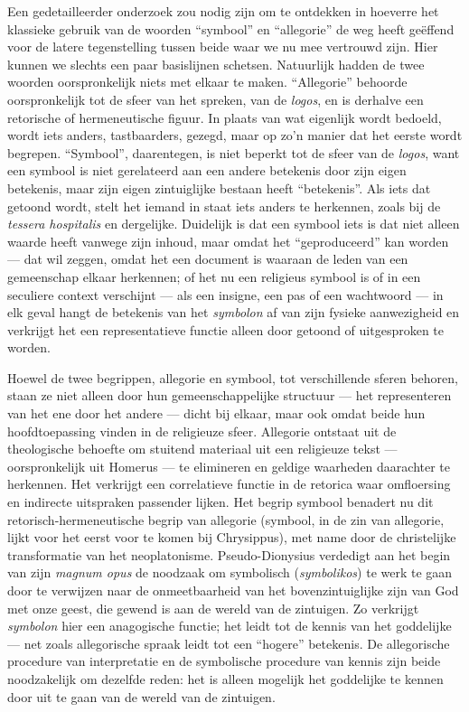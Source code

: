 Een gedetailleerder onderzoek zou nodig zijn om te ontdekken in hoeverre het klassieke gebruik van de woorden ``symbool'' en ``allegorie'' de weg heeft geëffend voor de latere tegenstelling tussen beide waar we nu mee vertrouwd zijn. Hier kunnen we slechts een paar basislijnen schetsen. Natuurlijk hadden de twee woorden oorspronkelijk niets met elkaar te maken. ``Allegorie'' behoorde oorspronkelijk tot de sfeer van het spreken, van de \textit{logos}, en is derhalve een retorische of hermeneutische figuur. In plaats van wat eigenlijk wordt bedoeld, wordt iets anders, tastbaarders, gezegd, maar op zo’n manier dat het eerste wordt begrepen. ``Symbool'', daarentegen, is niet beperkt tot de sfeer van de \textit{logos}, want een symbool is niet gerelateerd aan een andere betekenis door zijn eigen betekenis, maar zijn eigen zintuiglijke bestaan heeft ``betekenis''. Als iets dat getoond wordt, stelt het iemand in staat iets anders te herkennen, zoals bij de \textit{tessera hospitalis} en dergelijke. Duidelijk is dat een symbool iets is dat niet alleen waarde heeft vanwege zijn inhoud, maar omdat het ``geproduceerd'' kan worden — dat wil zeggen, omdat het een document is waaraan de leden van een gemeenschap elkaar herkennen; of het nu een religieus symbool is of in een seculiere context verschijnt — als een insigne, een pas of een wachtwoord — in elk geval hangt de betekenis van het \textit{symbolon} af van zijn fysieke aanwezigheid en verkrijgt het een representatieve functie alleen door getoond of uitgesproken te worden.

Hoewel de twee begrippen, allegorie en symbool, tot verschillende sferen behoren, staan ze niet alleen door hun gemeenschappelijke structuur — het representeren van het ene door het andere — dicht bij elkaar, maar ook omdat beide hun hoofdtoepassing vinden in de religieuze sfeer. Allegorie ontstaat uit de theologische behoefte om stuitend materiaal uit een religieuze tekst — oorspronkelijk uit Homerus — te elimineren en geldige waarheden daarachter te herkennen. Het verkrijgt een correlatieve functie in de retorica waar omfloersing en indirecte uitspraken passender lijken. Het begrip symbool benadert nu dit retorisch-hermeneutische begrip van allegorie (symbool, in de zin van allegorie, lijkt voor het eerst voor te komen bij Chrysippus), met name door de christelijke transformatie van het neoplatonisme. Pseudo-Dionysius verdedigt aan het begin van zijn \textit{magnum opus} de noodzaak om symbolisch (\textit{symbolikos}) te werk te gaan door te verwijzen naar de onmeetbaarheid van het bovenzintuiglijke zijn van God met onze geest, die gewend is aan de wereld van de zintuigen. Zo verkrijgt \textit{symbolon} hier een anagogische functie; het leidt tot de kennis van het goddelijke — net zoals allegorische spraak leidt tot een ``hogere'' betekenis. De allegorische procedure van interpretatie en de symbolische procedure van kennis zijn beide noodzakelijk om dezelfde reden: het is alleen mogelijk het goddelijke te kennen door uit te gaan van de wereld van de zintuigen.

